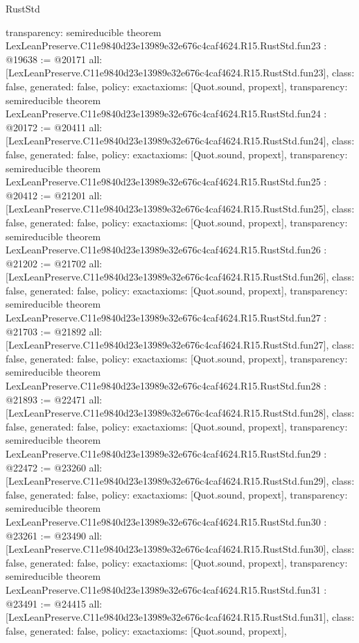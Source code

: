 \begin{lexlean}{RustStd}
\begin{coremodule}
{  transparency: semireducible
}
theorem LexLeanPreserve.C11e9840d23e13989e32e676c4caf4624.R15.RustStd.fun23 : @19638 := @20171 {
  all: [LexLeanPreserve.C11e9840d23e13989e32e676c4caf4624.R15.RustStd.fun23],
  class: false,
  generated: false,
  policy: exact{axioms: [Quot.sound, propext]},
  transparency: semireducible
}
theorem LexLeanPreserve.C11e9840d23e13989e32e676c4caf4624.R15.RustStd.fun24 : @20172 := @20411 {
  all: [LexLeanPreserve.C11e9840d23e13989e32e676c4caf4624.R15.RustStd.fun24],
  class: false,
  generated: false,
  policy: exact{axioms: [Quot.sound, propext]},
  transparency: semireducible
}
theorem LexLeanPreserve.C11e9840d23e13989e32e676c4caf4624.R15.RustStd.fun25 : @20412 := @21201 {
  all: [LexLeanPreserve.C11e9840d23e13989e32e676c4caf4624.R15.RustStd.fun25],
  class: false,
  generated: false,
  policy: exact{axioms: [Quot.sound, propext]},
  transparency: semireducible
}
theorem LexLeanPreserve.C11e9840d23e13989e32e676c4caf4624.R15.RustStd.fun26 : @21202 := @21702 {
  all: [LexLeanPreserve.C11e9840d23e13989e32e676c4caf4624.R15.RustStd.fun26],
  class: false,
  generated: false,
  policy: exact{axioms: [Quot.sound, propext]},
  transparency: semireducible
}
theorem LexLeanPreserve.C11e9840d23e13989e32e676c4caf4624.R15.RustStd.fun27 : @21703 := @21892 {
  all: [LexLeanPreserve.C11e9840d23e13989e32e676c4caf4624.R15.RustStd.fun27],
  class: false,
  generated: false,
  policy: exact{axioms: [Quot.sound, propext]},
  transparency: semireducible
}
theorem LexLeanPreserve.C11e9840d23e13989e32e676c4caf4624.R15.RustStd.fun28 : @21893 := @22471 {
  all: [LexLeanPreserve.C11e9840d23e13989e32e676c4caf4624.R15.RustStd.fun28],
  class: false,
  generated: false,
  policy: exact{axioms: [Quot.sound, propext]},
  transparency: semireducible
}
theorem LexLeanPreserve.C11e9840d23e13989e32e676c4caf4624.R15.RustStd.fun29 : @22472 := @23260 {
  all: [LexLeanPreserve.C11e9840d23e13989e32e676c4caf4624.R15.RustStd.fun29],
  class: false,
  generated: false,
  policy: exact{axioms: [Quot.sound, propext]},
  transparency: semireducible
}
theorem LexLeanPreserve.C11e9840d23e13989e32e676c4caf4624.R15.RustStd.fun30 : @23261 := @23490 {
  all: [LexLeanPreserve.C11e9840d23e13989e32e676c4caf4624.R15.RustStd.fun30],
  class: false,
  generated: false,
  policy: exact{axioms: [Quot.sound, propext]},
  transparency: semireducible
}
theorem LexLeanPreserve.C11e9840d23e13989e32e676c4caf4624.R15.RustStd.fun31 : @23491 := @24415 {
  all: [LexLeanPreserve.C11e9840d23e13989e32e676c4caf4624.R15.RustStd.fun31],
  class: false,
  generated: false,
  policy: exact{axioms: [Quot.sound, propext]},
}
\end{coremodule}
\end{lexlean}
